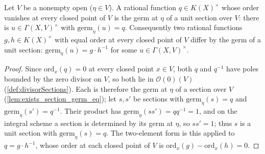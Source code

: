 \begin{lemma}
  \label{lem:exists_germGenericUnits_ordMatch}
  \leanok
  Let \(V\) be a nonempty open (\(\eta \in V\)). A rational function \(q \in K(X)^{\times}\) whose
  order vanishes at every closed point of \(V\) is the germ at \(\eta\) of a unit section over
  \(V\): there is \(u \in \Gamma(X,V)^{\times}\) with \(\mathrm{germ}_\eta(u) = q\). Consequently
  two rational functions \(g, h \in K(X)^{\times}\) with equal order at every closed point of
  \(V\) differ by the germ of a unit section: \(\mathrm{germ}_\eta(u) = g \cdot h^{-1}\) for some
  \(u \in \Gamma(X,V)^{\times}\).
\end{lemma}
\begin{proof}
  \leanok
  Since \(\mathrm{ord}_x(q) = 0\) at every closed point \(x \in V\), both \(q\) and \(q^{-1}\) have
  poles bounded by the zero divisor on \(V\), so both lie in \(\mathcal O(0)(V)\)
  (\ref{def:divisorSections}). Each is therefore the germ at \(\eta\) of a section over \(V\)
  (\ref{lem:exists_section_germ_eq}); let \(s, s'\) be sections with \(\mathrm{germ}_\eta(s) = q\)
  and \(\mathrm{germ}_\eta(s') = q^{-1}\). Their product has \(\mathrm{germ}_\eta(s s') = q q^{-1}
  = 1\), and on the integral scheme a section is determined by its germ at \(\eta\), so \(s s' =
  1\); thus \(s\) is a unit section with \(\mathrm{germ}_\eta(s) = q\). The two-element form is
  this applied to \(q = g \cdot h^{-1}\), whose order at each closed point of \(V\) is
  \(\mathrm{ord}_x(g) - \mathrm{ord}_x(h) = 0\).
\end{proof}

